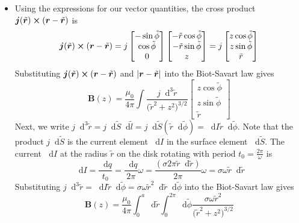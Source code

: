 \documentclass[11pt, a4paper]{article}
\newcommand{\diff}{\mathop{}\!\mathrm{d}} %
\renewcommand{\vec}[1]{\bm{#1}} %
\newcommand{\tvec}[1]{\tilde{\vec{#1}}} %
\renewcommand{\t}[1]{\tilde{#1}} %
\renewcommand{\r}{\vec{r}}
\newcommand{\B}{\vec{B}} %
\begin{document}
\begin{itemize}
	\item Using the expressions for our vector quantities, the cross product $ \vec{j}(\tvec{r}) \cross (\r - \tvec{r}) $ is
	\begin{equation*}
		\vec{j}(\tvec{r}) \cross (\r - \tvec{r}) = j
		\begin{bmatrix}
			-\sin \t{\phi}\\
			\cos \t{\phi}\\
			0
		\end{bmatrix}
		\begin{bmatrix}
			-\tilde{r} \cos \tilde{\phi}\\
			- \tilde{r} \sin \tilde{\phi}\\
			z
		\end{bmatrix}
		= j
		\begin{bmatrix}
			z \cos \t{\phi}\\
			z \sin \t{\phi}\\
			\t{r}
		\end{bmatrix}
	\end{equation*}
	Substituting $ \vec{j}(\tvec{r}) \cross (\r - \tvec{r}) $ and $  \abs{\r - \tvec{r}} $ into the Biot-Savart law gives
	\begin{equation*}
		\B(z) = \frac{\mu_{0}}{4 \pi} \int \frac{j \diff^{3} \t{r}}{\big(\tilde{r}^{2} + z^{2}\big)^{3/2}} 
		\begin{bmatrix}
			z \cos \t{\phi}\\
			z \sin \t{\phi}\\
			\t{r}
		\end{bmatrix}
	\end{equation*}
	Next, we write $ j \diff^{3}\t{r} = j \diff \t{S} \diff \t{l} = j \diff \t{S} (\t{r} \diff \t{\phi} ) = \diff I \t{r} \diff \t{\phi} $. Note that the product $ j \diff \t{S} $ is the current element $ \diff I $ in the surface element $ \diff \tilde{S} $. The current $ \diff I $ at the radius $ \t{r} $ on the disk rotating with period $ t_{0} = \frac{2\pi}{\omega} $ is
	\begin{equation*}
		\diff I = \frac{\diff q}{t_{0}} = \frac{\diff q}{2\pi} \omega  = \frac{(\sigma 2\pi \t{r}\diff \t r)}{2\pi} \omega = \sigma \omega \t{r} \diff \t{r}
	\end{equation*}
	Substituting $ j \diff^{3}\t{r} =  \diff I \t{r} \diff \t{\phi}  =  \sigma \omega \t{r}^{2} \diff \t{r} \diff \t{\phi}  $ into the Biot-Savart law gives
	\begin{equation*}
		\B(z) = \frac{\mu_{0}}{4 \pi} \int_{0}^{a} \diff \t{r} \int_{0}^{2\pi} \diff \t{\phi}	\frac{\sigma \omega \t{r}^{2}}{\big(\tilde{r}^{2} + z^{2}\big)^{3/2}} 

\end{equation*}
\end{itemize}
\end{document}
